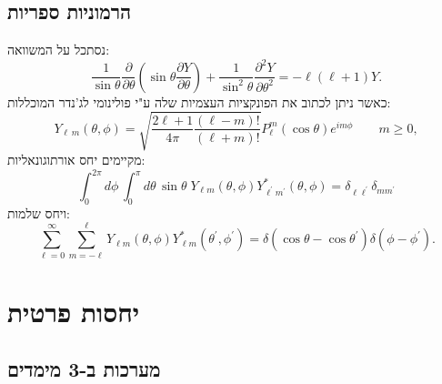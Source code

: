 \documentclass{tstextbook}
\begin{document}
\subsection{הרמוניות ספריות}

נסתכל על המשוואה:
$$\frac{1}{\sin\theta}\frac{\partial}{\partial\theta}\left(\sin\theta\frac{\partial Y}{\partial\theta}\right)+\frac{1}{\sin^{2}\theta}\frac{\partial^{2}Y}{\partial\theta^{2}}=-\ell(\ell+1)Y.$$
כאשר ניתן לכתוב את הפונקציות העצמיות שלה ע"י פולינומי לג'נדר המוכללות:
$$Y_{\ell\,m}(\theta,\phi)=\sqrt{\frac{2\ell+1}{4\pi}\frac{(\ell-m)!}{(\ell+m)!}}P_{\ell}^{m}(\cos\theta)e^{i m\phi}\qquad m\ge0,$$
מקיימים יחס אורתוגונאליות:
$$\int_{0}^{2\pi}d\phi\,\int_{0}^{\pi}d\theta\,\sin\theta\;Y_{\ell m}(\theta,\phi)Y_{\ell^{\prime}m^{\prime}}^{\ast}(\theta,\phi)=\delta_{\ell\ell^{\prime}}\delta_{m m^{\prime}}$$
ויחס שלמות:
$$\sum_{\ell=0}^{\infty}\sum_{m=-\ell}^{\ell}Y_{\ell m}(\theta,\phi)Y_{\ell m}^{*}(\theta^{\prime},\phi^{\prime})=\delta(\cos\theta-\cos\theta^{\prime})\delta(\phi-\phi^{\prime}).$$

\section{יחסות פרטית}

\subsection{מערכות ב-3 מימדים}
\end{document}
